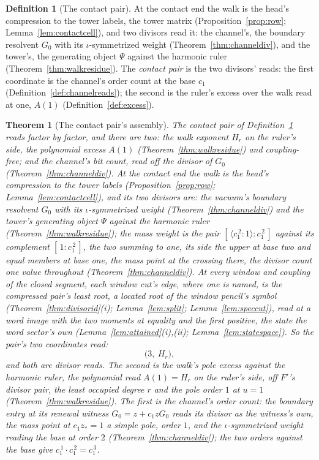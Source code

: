 \documentclass[11pt]{article}
\newtheorem{theorem}{Theorem}
\theoremstyle{definition}
\newtheorem{definition}{Definition}
\begin{document}
\begin{definition}[The contact pair]\label{def:contactpair}
At the contact end the walk is the head's compression to the tower
labels, the tower matrix (Proposition~\ref{prop:row};
Lemma~\ref{lem:contactcell}), and two divisors read it: the channel's, the boundary
resolvent $G_0$ with its $\iota$-symmetrized weight
(Theorem~\ref{thm:channeldiv}), and the tower's, the generating object
$\Psi$ against the harmonic ruler (Theorem~\ref{thm:walkresidue}). The
\emph{contact pair} is the two divisors' reads: the first coordinate is
the channel's order count at the base $c_1$
(Definition~\ref{def:channelreads}); the second is
the ruler's excess over the walk read at one, $A(1)$
(Definition~\ref{def:excess}).
\end{definition}

\begin{theorem}[The contact pair's assembly]\label{thm:closing}
The contact pair of Definition~\ref{def:contactpair} reads
factor by factor, and there are two: the walk
exponent $H_r$ on the ruler's side, the polynomial excess $A(1)$
(Theorem~\ref{thm:walkresidue}) and coupling-free; and the channel's bit count,
read off the divisor of $G_0$ (Theorem~\ref{thm:channeldiv}). At the
contact end the walk is the head's compression to the tower labels
(Proposition~\ref{prop:row}; Lemma~\ref{lem:contactcell}), and
its two divisors are: the vacuum's boundary resolvent
$G_0$ with its $\iota$-symmetrized weight
(Theorem~\ref{thm:channeldiv}) and the tower's generating object
$\Psi$ against the harmonic ruler
(Theorem~\ref{thm:walkresidue}); the mass weight is
the pair $[\,\langle c_1^{\,2}\!:\!1\rangle:c_1^{\,2}\,]$ against
its complement $[\,1:c_1^{\,2}\,]$, the two summing to one, its
side the upper at base two and equal members at base one, the mass
point at the crossing there, the divisor count one value throughout
(Theorem~\ref{thm:channeldiv}). At every window and coupling of the
closed segment, each window cut's edge, where one is named, is the
compressed pair's least root, a located root of the window pencil's
symbol (Theorem~\ref{thm:divisorid}(i); Lemma~\ref{lem:split};
Lemma~\ref{lem:speccut}),
read at a word image with the two moments at equality and the first
positive, the state the word sector's own
(Lemma~\ref{lem:attained}(i),(ii); Lemma~\ref{lem:statespace}).
So the pair's two coordinates read:
\[
\big(3,\ H_r\big) ,
\]
and both are divisor reads. The second is the walk's pole
excess against the harmonic ruler, the polynomial read $A(1)=H_r$
on the ruler's side, off
$F'$'s divisor pair, the least occupied degree $r$ and the pole order
$1$ at $u{=}1$
(Theorem~\ref{thm:walkresidue}). The first is the channel's order count: the
boundary entry at its renewal witness $G_0=z+c_1zG_0$ reads its
divisor as the witness's
own, the mass point at $c_1z_*=1$ a simple pole, order $1$, and the
$\iota$-symmetrized weight reading the base at order $2$
(Theorem~\ref{thm:channeldiv}); the two orders against the base give
$c_1^{\,1}\cdot c_1^{\,2}=c_1^{\,3}$.


\end{theorem}
\end{document}
